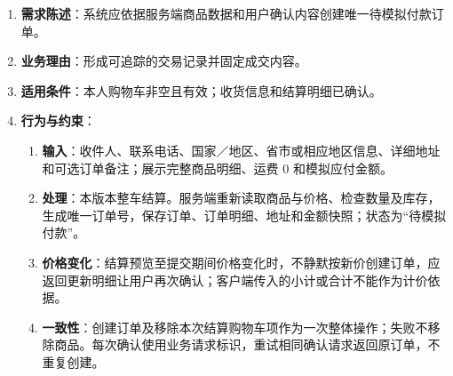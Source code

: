 \begin{enumerate}
\item {\bfseries 需求陈述}：系统应依据服务端商品数据和用户确认内容创建唯一待模拟付款订单。
\item {\bfseries 业务理由}：形成可追踪的交易记录并固定成交内容。
\item {\bfseries 适用条件}：本人购物车非空且有效；收货信息和结算明细已确认。
\item {\bfseries 行为与约束}：
\begin{enumerate}
\item {\bfseries 输入}：收件人、联系电话、国家／地区、省市或相应地区信息、详细地址和可选订单备注；展示完整商品明细、运费 0 和模拟应付金额。
\item {\bfseries 处理}：本版本整车结算。服务端重新读取商品与价格、检查数量及库存，生成唯一订单号，保存订单、订单明细、地址和金额快照；状态为“待模拟付款”。
\item {\bfseries 价格变化}：结算预览至提交期间价格变化时，不静默按新价创建订单，应返回更新明细让用户再次确认；客户端传入的小计或合计不能作为计价依据。
\item {\bfseries 一致性}：创建订单及移除本次结算购物车项作为一次整体操作；失败不移除商品。每次确认使用业务请求标识，重试相同确认请求返回原订单，不重复创建。
\end{enumerate}

\end{enumerate}


